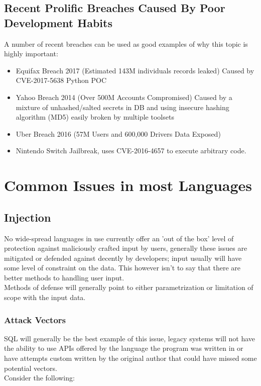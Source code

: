 \documentclass{IEEEtran}
\begin{document}
        \subsection{Recent Prolific Breaches Caused By Poor Development Habits}
            A number of recent breaches can be used as good examples of why this topic is highly 
            important:
            \begin{itemize}
                \item Equifax Breach 2017 (Estimated 143M individuals records leaked)\cite{Equifax-FTC}
                Caused by CVE-2017-5638\cite{CVE-2017-5638} Python POC\cite{POC-CVE-2017-5638}
                \item Yahoo Breach 2014 (Over 500M Accounts Compromised)\cite{Yahoo-Breach} Caused 
                by a mixture of unhashed/salted secrets in DB and using insecure hashing algorithm 
                (MD5) easily broken by multiple toolsets\cite{John-The-Ripper}
                \item Uber Breach 2016 (57M Users and 600,000 Drivers Data Exposed)\cite{Uber-Breach}
                \item Nintendo Switch Jailbreak, uses CVE-2016-4657\cite{CVE-2016-4657} to 
                execute arbitrary code.
                
            \end{itemize}

    \section{Common Issues in most Languages}
        \subsection{Injection}
            \label{sec:injection}
            No wide-spread languages in use currently offer an 'out of the box' level of 
            protection against maliciously crafted input by users, generally these issues are 
            mitigated or defended against decently by developers; input usually will have some level
            of constraint on the data.
            This however isn't to say that there are better methods to handling user input.
            \\
            Methods of defense will generally point to either parametrization or limitation of scope 
            with the input data.

            \subsubsection{Attack Vectors}
                SQL will generally be the best example of this issue, legacy systems will not have 
                the ability to use APIs offered by the language the program was written in or 
                have attempts custom written by the original author that could have missed some 
                potential vectors.
                \\
                Consider the following:
\end{document}
